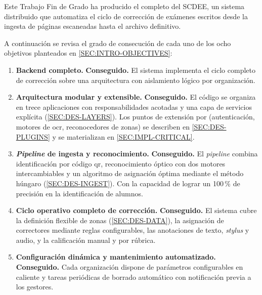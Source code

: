 Este Trabajo Fin de Grado ha producido el  completo del
SCDEE, un sistema distribuido  que automatiza el ciclo
de corrección de exámenes escritos desde la ingesta de páginas escaneadas
hasta el archivo definitivo.

A continuación se revisa el grado de consecución de cada uno de los ocho
objetivos planteados en \cref{SEC:INTRO-OBJECTIVES}:

\begin{enumerate}

  \item \textbf{Backend  completo.}
  \label{OBJ:BACKEND-MULTITENANT}
  \textbf{Conseguido.} El sistema implementa el ciclo completo de
  corrección sobre una arquitectura  con aislamiento
  lógico por organización.

  \item \textbf{Arquitectura modular y extensible.}
  \label{OBJ:MODULAR-ARCH}
  \textbf{Conseguido.} El código se organiza en trece aplicaciones con
  responsabilidades acotadas y una capa de servicios explícita
  (\cref{SEC:DES-LAYERS}). Los puntos de extensión por 
  (autenticación, motores de \acs{ocr}, reconocedores de zonas) se
  describen en \cref{SEC:DES-PLUGINS} y se materializan en
  \cref{SEC:IMPL-CRITICAL}.

  \item \textbf{\textit{Pipeline} de ingesta y reconocimiento.}
  \label{OBJ:OCR-PIPELINE}
  \textbf{Conseguido.} El \textit{pipeline} combina identificación por
  código \acs{qr}, reconocimiento óptico con dos motores intercambiables
  y un algoritmo de asignación óptima mediante el método húngaro
  (\cref{SEC:DES-INGEST}). Con la capacidad de lograr un 100\,\% de
  precisión en la identificación de alumnos.

  \item \textbf{Ciclo operativo completo de corrección.}
  \label{OBJ:GRADING-CYCLE}
  \textbf{Conseguido.} El sistema cubre la definición flexible de zonas
  (\cref{SEC:DES-DATA}), la asignación de correctores mediante reglas
  configurables, las anotaciones de texto,
  \textit{stylus} y audio, y la calificación manual
  y por rúbrica.

  \item \textbf{Configuración dinámica y mantenimiento automatizado.}
  \label{OBJ:CONFIG-MAINTENANCE}
  \textbf{Conseguido.} Cada organización dispone de parámetros
  configurables en caliente y tareas periódicas de borrado automático
  con notificación previa a los gestores.


\end{enumerate}
